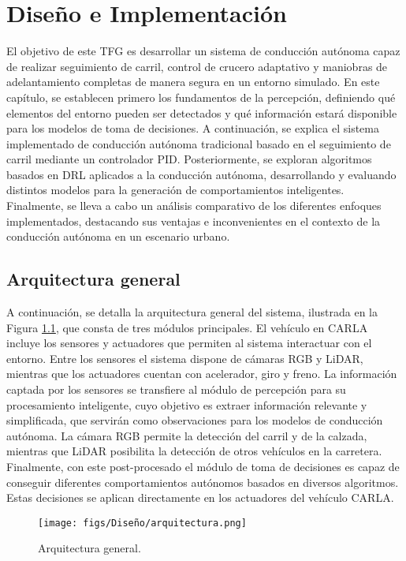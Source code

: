 \chapter{Diseño e Implementación}
\label{cap:capitulo4}

El objetivo de este \ac{TFG} es desarrollar un sistema de conducción autónoma capaz de realizar seguimiento de carril, control de crucero adaptativo y maniobras de adelantamiento completas de manera segura en un entorno simulado. En este capítulo, se establecen primero los fundamentos de la percepción, definiendo qué elementos del entorno pueden ser detectados y qué información estará disponible para los modelos de toma de decisiones. A continuación, se explica el sistema implementado de conducción autónoma tradicional basado en el seguimiento de carril mediante un controlador \ac{PID}. Posteriormente, se exploran algoritmos basados en \ac{DRL} aplicados a la conducción autónoma, desarrollando y evaluando distintos modelos para la generación de comportamientos inteligentes. Finalmente, se lleva a cabo un análisis comparativo de los diferentes enfoques implementados, destacando sus ventajas e inconvenientes en el contexto de la conducción autónoma en un escenario urbano.

\section{Arquitectura general}

A continuación, se detalla la arquitectura general del sistema, ilustrada en la Figura \ref{fig:arch}, que consta de tres módulos principales. El vehículo en CARLA incluye los sensores y actuadores que permiten al sistema interactuar con el entorno. Entre los sensores el sistema dispone de cámaras RGB y \ac{LiDAR}, mientras que los actuadores cuentan con acelerador, giro y freno. La información captada por los sensores se transfiere al módulo de percepción para su procesamiento inteligente, cuyo objetivo es extraer información relevante y simplificada, que servirán como observaciones para los modelos de conducción autónoma. La cámara RGB permite la detección del carril y de la calzada, mientras que \ac{LiDAR} posibilita la detección de otros vehículos en la carretera. Finalmente, con este post-procesado el módulo de toma de decisiones es capaz de conseguir diferentes comportamientos autónomos basados en diversos algoritmos. Estas decisiones se aplican directamente en los actuadores del vehículo CARLA.

\begin{figure}[ht]
  \centering
  \texttt{[image: figs/Diseño/arquitectura.png]}
  \caption{Arquitectura general.}
  \label{fig:arch}
\end{figure}

